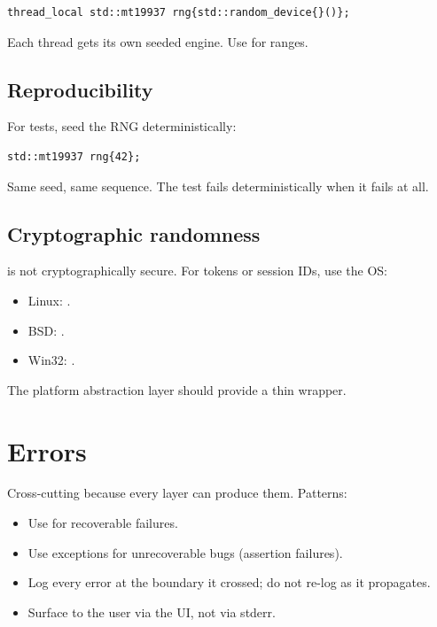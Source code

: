 \begin{lstlisting}
thread_local std::mt19937 rng{std::random_device{}()};
\end{lstlisting}

Each thread gets its own seeded engine. Use
 for ranges.

\subsection*{Reproducibility}

For tests, seed the RNG deterministically:

\begin{lstlisting}
std::mt19937 rng{42};
\end{lstlisting}

Same seed, same sequence. The test fails deterministically when
it fails at all.

\subsection*{Cryptographic randomness}

 is not cryptographically secure. For tokens
or session IDs, use the OS:

\begin{itemize}[leftmargin=*]
  \item Linux: .
  \item BSD: .
  \item Win32: .
\end{itemize}

The platform abstraction layer should provide a thin wrapper.

\section{Errors}

Cross-cutting because every layer can produce them. Patterns:

\begin{itemize}[leftmargin=*]
  \item Use  for recoverable failures.
  \item Use exceptions for unrecoverable bugs (assertion
    failures).
  \item Log every error at the boundary it crossed; do not
    re-log as it propagates.
  \item Surface to the user via the UI, not via stderr.
\end{itemize}

